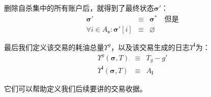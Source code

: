 \documentclass[UTF8,nofonts]{ctexart}
\begin{document}
\begin{multicols}{2}
删除自杀集中的所有账户后，就得到了最终状态$\boldsymbol{\sigma}'$：
\begin{eqnarray}
\boldsymbol{\sigma}' & \equiv & \boldsymbol{\sigma}^* \quad \text{但是} \\
\forall i \in A_\mathbf{s}: \boldsymbol{\sigma}'[i] & \equiv & \varnothing
\end{eqnarray}

最后我们定义该交易的耗油总量$\Upsilon^g$，以及该交易生成的日志$\Upsilon^\mathbf{l}$为：
\begin{eqnarray}
\Upsilon^g(\boldsymbol{\sigma}, T) & \equiv & T_g - g' \\
\Upsilon^\mathbf{l}(\boldsymbol{\sigma}, T) & \equiv & A_\mathbf{l}
\end{eqnarray}

它们可以帮助定义我们后续要讲的交易收据。







\end{multicols}
\end{document}
